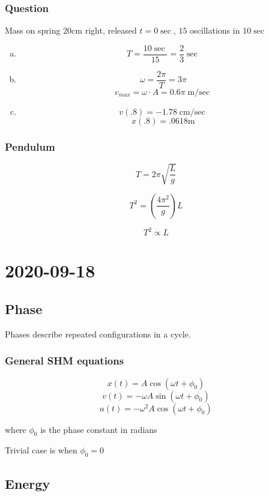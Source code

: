 \subsubsection{Question}

Mass on spring $20\si{\cm}$ right, released $t = 0\sec$, $15$ oscillations in $10\sec$

\begin{enumerate}[a.]
    \item $$T = \frac{10\sec}{15} = \frac{2}{3}\sec$$
    \item $$\omega = \frac{2\pi}{T} = 3\pi$$
    $$v_{max} = \omega \cdot A = 0.6\pi \si{\m\per\sec}$$
    \item $$v(.8) = -1.78 \si{\cm\per\sec}$$
    $$x(.8) = .0618\si{\m}$$
\end{enumerate}

\subsubsection{Pendulum}

$$T = 2\pi \sqrt{\frac{L}{g}}$$

$$T^2 = \left(\frac{4\pi^2}{g}\right)L$$

$$T^2 \propto L$$

\section{2020-09-18}

\subsection{Phase}

Phases describe repeated configurations in a cycle.

\subsubsection{General SHM equations}

$$x(t) = A\cos(\omega t + \phi_0)$$
$$v(t) = -\omega A\sin(\omega t + \phi_0)$$
$$a(t) = -\omega^2 A\cos(\omega t + \phi_0)$$

where $\phi_0$ is the phase constant in radians

Trivial case is when $\phi_0 = 0$

\subsection{Energy}

